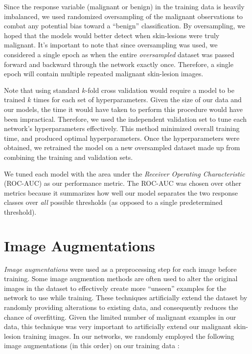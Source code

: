 \documentclass [MAS] {uclathes}
\begin{document}
Since the response variable (malignant or benign) in the training data is heavily imbalanced, we used randomized oversampling of the malignant observations to combat any potential bias toward a ``benign'' classification. By oversampling, we hoped that the models would better detect when skin-lesions were truly malignant. It's important to note that since oversampling was used, we considered a single epoch as when the entire \textit{oversampled} dataset was passed forward and backward through the network exactly once. Therefore, a single epoch will contain multiple repeated malignant skin-lesion images.

Note that using standard $k$-fold cross validation would require a model to be trained $k$ times for each set of hyperparameters. Given the size of our data and our models, the time it would have taken to perform this procedure would have been impractical. Therefore, we used the independent validation set to tune each network's hyperparameters effectively. This method minimized overall training time, and produced optimal hyperparameters. Once the hyperparameters were obtained, we retrained the model on a new oversampled dataset made up from combining the training and validation sets.

We tuned each model with the area under the \textit{Receiver Operating Characteristic} (ROC-AUC) as our performance
metric. The ROC-AUC was chosen over other metrics because it summarizes how well our model separates the two response
classes over \textit{all} possible thresholds (as opposed to a single predetermined threshold). 

\section{Image Augmentations}

\textit{Image augmentations} were used as a preprocessing step for each image before training. Some image augmention methods are often used to alter the original images in the dataset to effectively create more ``unseen'' examples for the network to use while training. These techniques artificially extend the dataset by randomly providing alterations to existing data, and consequently reduces the chance of overfitting. Given the limited number of malignant examples in our data, this technique was very important to artificially extend our malignant skin-lesion training images. In our networks, we randomly employed the following image augmentations (in this order) on our training data \cite{AUG}:
\end{document}
